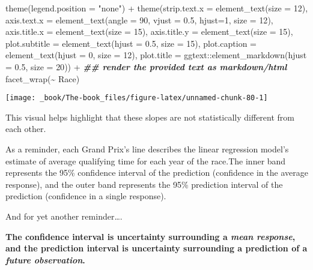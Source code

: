\documentclass[
]{book}
\newenvironment{Shaded}{\begin{snugshade}}{\end{snugshade}}
\newcommand{\AttributeTok}[1]{\textcolor[rgb]{0.77,0.63,0.00}{#1}}
\newcommand{\DecValTok}[1]{\textcolor[rgb]{0.00,0.00,0.81}{#1}}
\newcommand{\DocumentationTok}[1]{\textcolor[rgb]{0.56,0.35,0.01}{\textbf{\textit{#1}}}}
\newcommand{\FloatTok}[1]{\textcolor[rgb]{0.00,0.00,0.81}{#1}}
\newcommand{\FunctionTok}[1]{\textcolor[rgb]{0.00,0.00,0.00}{#1}}
\newcommand{\NormalTok}[1]{#1}
\newcommand{\SpecialCharTok}[1]{\textcolor[rgb]{0.00,0.00,0.00}{#1}}
\newcommand{\StringTok}[1]{\textcolor[rgb]{0.31,0.60,0.02}{#1}}
\begin{document}
\begin{Shaded}
\begin{Highlighting}[]
  \FunctionTok{theme}\NormalTok{(}\AttributeTok{legend.position =} \StringTok{"none"}\NormalTok{) }\SpecialCharTok{+}
  \FunctionTok{theme}\NormalTok{(}\AttributeTok{strip.text.x =} \FunctionTok{element\_text}\NormalTok{(}\AttributeTok{size =} \DecValTok{12}\NormalTok{),}
        \AttributeTok{axis.text.x =} \FunctionTok{element\_text}\NormalTok{(}\AttributeTok{angle =} \DecValTok{90}\NormalTok{, }\AttributeTok{vjust =} \FloatTok{0.5}\NormalTok{, }\AttributeTok{hjust=}\DecValTok{1}\NormalTok{, }\AttributeTok{size =} \DecValTok{12}\NormalTok{),}
        \AttributeTok{axis.title.x =} \FunctionTok{element\_text}\NormalTok{(}\AttributeTok{size =} \DecValTok{15}\NormalTok{),}
        \AttributeTok{axis.title.y =} \FunctionTok{element\_text}\NormalTok{(}\AttributeTok{size =} \DecValTok{15}\NormalTok{),}
         \AttributeTok{plot.subtitle =} \FunctionTok{element\_text}\NormalTok{(}\AttributeTok{hjust =} \FloatTok{0.5}\NormalTok{, }\AttributeTok{size =} \DecValTok{15}\NormalTok{),}
         \AttributeTok{plot.caption =} \FunctionTok{element\_text}\NormalTok{(}\AttributeTok{hjust =} \DecValTok{0}\NormalTok{, }\AttributeTok{size =} \DecValTok{12}\NormalTok{),}
        \AttributeTok{plot.title =}\NormalTok{ ggtext}\SpecialCharTok{::}\FunctionTok{element\_markdown}\NormalTok{(}\AttributeTok{hjust =} \FloatTok{0.5}\NormalTok{, }\AttributeTok{size =} \DecValTok{20}\NormalTok{)) }\SpecialCharTok{+} \DocumentationTok{\#\# render the provided text as markdown/html}
  \FunctionTok{facet\_wrap}\NormalTok{(}\SpecialCharTok{\textasciitilde{}}\NormalTok{ Race)}
\end{Highlighting}
\end{Shaded}

\begin{center}\texttt{[image: \_book/The-book\_files/figure-latex/unnamed-chunk-80-1]} \end{center}

This visual helps highlight that these slopes are not statistically different from each other.

As a reminder, each Grand Prix's line describes the linear regression model's estimate of average qualifying time for each year of the race.The inner band represents the 95\% confidence interval of the prediction (confidence in the average response), and the outer band represents the 95\% prediction interval of the prediction (confidence in a single response).

And for yet another reminder\ldots.

\textbf{The confidence interval is uncertainty surrounding a \emph{mean response}, and the prediction interval is uncertainty surrounding a prediction of a \emph{future observation}.}
\end{document}

